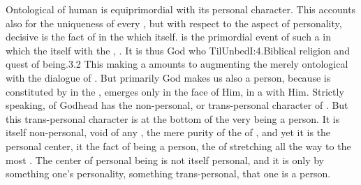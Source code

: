 Ontological  of human  is equiprimordial with its
personal character.  This  accounts also for the uniqueness of
every , but with respect to the aspect of personality, decisive is
the fact of  in the  which  itself.
 is the primordial event of such a  in which the
 itself with the , . It is
thus God who \citet{makes of us a complete person and, consequently, in a
  meeting with us is fully personal.}{TilUnbed}{I:4.Biblical religion and quest
  of being.3.2} This making a  amounts to augmenting the
merely ontological  with the dialogue of .  But primarily God makes us also a person, because 
is constituted by  in the , emerges only in the
face of Him, in a  with Him.  Strictly speaking,
 of Godhead has the non-personal, or trans-personal character of
. But this trans-personal character is at the bottom of the very being
a person.  It is itself non-personal, void of any , the mere purity
of the  of , and yet it is the personal center, it
 the fact of being a person, the  of 
stretching all the way to the most . The center of
personal being is not itself personal, and it is only by 
something  one's personality, something trans-personal, that
one is a person.

